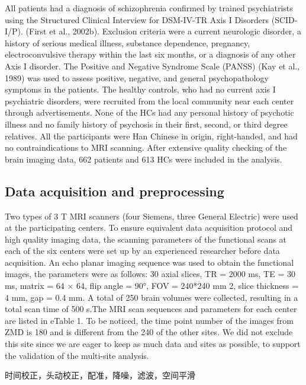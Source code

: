\documentclass[preprint,authoryear,review,12pt]{elsarticle}
\begin{document}
All patients had a diagnosis of schizophrenia confirmed by trained psychiatrists using the Structured Clinical Interview for DSM-IV-TR Axis I Disorders (SCID-I/P). (First et al., 2002b). Exclusion criteria were a current neurologic disorder, a history of serious medical illness, substance dependence, pregnancy, electroconvulsive therapy within the last six months, or a diagnosis of any other Axis I disorder. The Positive and Negative Syndrome Scale (PANSS)  (Kay et al., 1989) was used to assess positive, negative, and general psychopathology symptoms in the patients. The healthy controls, who had no current axis I psychiatric disorders, were recruited from the local community near each center through advertisements. None of the HCs had any personal history of psychotic illness and no family history of psychosis in their first, second, or third degree relatives. All the participants were Han Chinese in origin, right-handed, and had no contraindications to MRI scanning. After extensive quality checking of the brain imaging data, 662 patients and 613 HCs were included in the analysis.
 
 
 
\subsection*{Data acquisition and preprocessing}
 
 
Two types of 3 T MRI scanners (four Siemens, three General Electric) were used at the participating centers. To ensure equivalent data acquisition protocol and high quality imaging data, the scanning parameters of the functional scans at each of the six centers were set up by an experienced researcher before data acquisition. An echo planar imaging sequence was used to obtain the
functional images, the parameters were as follows: 30 axial slices, TR = 2000 ms, TE = 30 ms, matrix = 64 × 64, flip angle = 90°, FOV = 240*240 mm 2, slice thickness = 4 mm, gap = 0.4 mm. A total of 250 brain volumes were collected, resulting in a total scan time of 500 s.The MRI scan sequences and parameters for each center are listed in eTable 1. To be noticed, the time point number of the images from ZMD is 180 and is different from the 240 of the other sites. We did not exclude this site since we are eager to keep as much data and sites as possible, to support the validation of the multi-site analysis.   

时间校正，头动校正，配准，降噪，滤波，空间平滑
\end{document}
